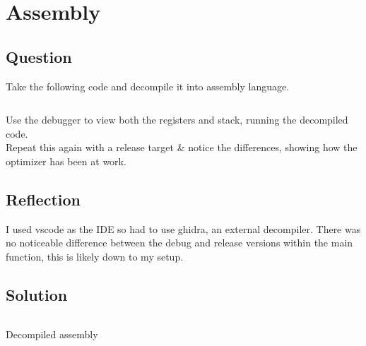 \section{Assembly}
    \subsection*{Question}
        Take the following code and decompile it into assembly language.

        \inputminted{cpp}{../Tasks/03-Assembly/Assembly.cpp}

        Use the debugger to view both the registers and stack, 
        running the decompiled code.\\

        Repeat this again with a release target \& notice the differences,
        showing how the optimizer has been at work.
    \subsection*{Reflection}
        I used vscode as the IDE so had to use ghidra, an external decompiler.
        There was no noticeable difference between the debug and release versions within the main function, 
        this is likely down to my setup.

    \subsection*{Solution}
        \begin{listing}[H]            
            {\renewcommand\fcolorbox[4][]{\textcolor{cyan}{\strut#4}}
                \inputminted[fontsize=\tiny]{gas}{../Tasks/03-Assembly/Assembly.txt}
                \caption{Decompiled assembly}
            }
        \end{listing}